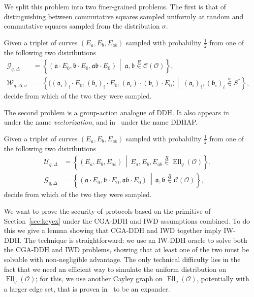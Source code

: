 \documentclass{llncs}
\newcommand{\Cl}{\mathcal{C}}
\renewcommand{\O}{\mathcal{O}}
\newcommand{\suchthat}{\,\middle\vert\,}
\renewcommand{\frak}{\mathfrak}
\newcommand{\rand}[1]{\overset{#1}{∈}}
\newcommand{\uni}{\rand{R}}
\DeclareMathOperator{\Ell}{Ell}
\begin{document}
We split this problem into two finer-grained problems. 
The first is that of distinguishing between 
commutative squares sampled uniformly at random 
and commutative squares sampled from the distribution $σ$.

\begin{definition}
    Given a triplet of curves $(E_a,E_b,E_{ab})$
    sampled with probability $\frac{1}{2}$ 
    from one of the following two distributions
  \begin{align*}
    \mathcal{G}_{q,Δ} &= \left\{(\frak a·E_0,\frak b·E_0,\frak{ab}·E_0) \suchthat
                        \frak a,\frak b\uni\Cl(\O)\right\},\\
    \mathcal{W}_{q,Δ,σ} &= \left\{\bigl((\frak a_i)_i·E_0,(\frak b_i)_i·E_0,(\frak a_i)·(\frak b_i)·E_0\bigr) \suchthat
                          (\frak a_i)_i,(\frak b_i)_i\rand{σ}S^*\right\},
  \end{align*}
  decide from which of the two they were sampled.
\end{definition}

The second problem is a group-action analogue of DDH.
It also appears in~\cite{cryptoeprint:2006:291} under the
name \emph{vectorization}, and in~\cite{Stol,Stolbunov2012} under the
name DDHAP.
 
\begin{definition}
    Given a triplet of curves $(E_a,E_b,E_{ab})$
    sampled with probability $\frac{1}{2}$ 
    from one of the following two distributions
  \begin{align*}
    \mathcal{U}_{q,Δ} &= \left\{(E_a,E_b,E_{ab}) \suchthat E_a,E_b,E_{ab}\uni\Ell_q(\O)\right\},\\
    \mathcal{G}_{q,Δ} &= \left\{(\frak a·E_0,\frak b·E_0,\frak{ab}·E_0) \suchthat
                        \frak a,\frak b\uni\Cl(\O)\right\},
  \end{align*}
  decide from which of the two they were sampled.
\end{definition}

We want to prove the security of protocols based on the primitive of
Section~\ref{sec:keyex} under the CGA-DDH and IWD assumptions
combined. To do this we give a lemma showing that CGA-DDH and IWD
together imply IW-DDH. The technique is straightforward: we use an
IW-DDH oracle to solve both the CGA-DDH and IWD problems, showing that
at least one of the two must be solvable with non-negligible
advantage. The only technical difficulty lies in the fact that we need
an efficient way to simulate the uniform distribution on $\Ell_q(\O)$;
for this, we use another Cayley graph on $\Ell_q(\O)$, potentially
with a larger edge set, that is proven
in~\cite{jao+miller+venkatesan09} to be an expander.
\end{document}
